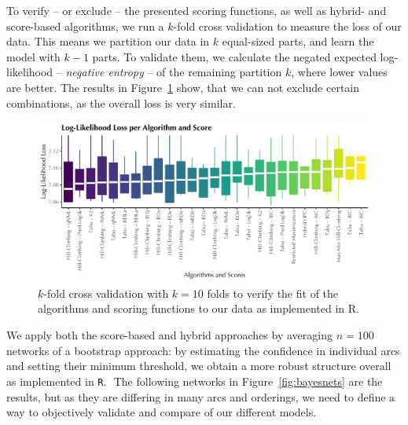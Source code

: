 \documentclass[twoside,twocolumn]{article}
\begin{document}
To verify -- or exclude -- the presented scoring functions, as well as hybrid- and score-based algorithms, we run a $k$-fold cross validation to measure the loss of our data. This means we 
partition our data in $k$ equal-sized parts, and learn the model with $k-1$ parts. To validate them, we calculate the negated expected log-likelihood -- \textit{negative entropy} --  of the remaining partition $k$, where lower values are better. \cite{Nagarajan2014} \cite{Hastie2009} \cite{Scutari2022} The results in Figure~\ref{fig:loss} show, that we can not exclude certain combinations, as the overall loss is very similar.


\begin{figure}[H]
\centering
\includegraphics[trim={0 0 0 0},clip, width=1.0\linewidth]{../1. Code/Implied Volatility/Exports/Networks/Loss}
  \caption[$k$-fold cross validation]{$k$-fold cross validation with $k = 10$ folds to verify the fit of the algorithms and scoring functions to our data as implemented in R.}
  \label{fig:loss}
\end{figure}

We apply both the score-based and hybrid approaches by averaging $n = 100$ networks of a bootstrap approach: by estimating the confidence in individual arcs and setting their minimum threshold, we obtain a more robust structure overall as implemented in \texttt{R}. ­­ The following networks in Figure~\ref{fig:bayesnets} are the results, but as they are differing in many arcs and orderings, we need to define a way to objectively validate and compare of our different models.\cite{Nagarajan2014}  \cite{Scutari2022}  \cite{Imoto2002} \cite{Friedman1999}
\end{document}
